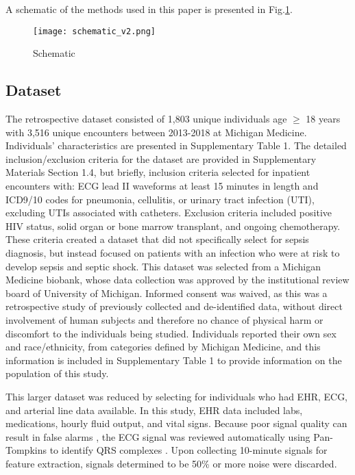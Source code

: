 
A schematic of the methods used in this paper is presented in Fig.\ref{fig:schematic}.

\begin{figure}[htb]
    \centering
    \texttt{[image: schematic\_v2.png]}
    \caption{Schematic}
    \label{fig:schematic}
\end{figure}

\subsection*{Dataset} \label{sec:methods_dataset}

The retrospective dataset consisted of 1,803 unique individuals age $\geq$ 18 years with 3,516 unique encounters between 2013-2018 at Michigan Medicine. Individuals' characteristics are presented in Supplementary Table 1. The detailed inclusion/exclusion criteria for the dataset are provided in Supplementary Materials Section 1.4, but briefly, inclusion criteria selected for inpatient encounters with: ECG lead II waveforms at least 15 minutes in length and ICD9/10 codes for pneumonia, cellulitis, or urinary tract infection (UTI), excluding UTIs associated with catheters. Exclusion criteria included positive HIV status, solid organ or bone marrow transplant, and ongoing chemotherapy. These criteria created a dataset that did not specifically select for sepsis diagnosis, but instead focused on patients with an infection who were at risk to develop sepsis and septic shock. This dataset was selected from a Michigan Medicine biobank, whose data collection was approved by the institutional review board of University of Michigan. Informed consent was waived, as this was a retrospective study of previously collected and de-identified data, without direct involvement of human subjects and therefore no chance of physical harm or discomfort to the individuals being studied. Individuals reported their own sex and race/ethnicity, from categories defined by Michigan Medicine, and this information is included in Supplementary Table 1 to provide information on the population of this study.

This larger dataset was reduced by selecting for individuals who had EHR, ECG, and arterial line data available. In this study, EHR data included labs, medications, hourly fluid output, and vital signs. Because poor signal quality can result in false alarms \autocite{gambarotta_review_2016}, the ECG signal was reviewed automatically using Pan-Tompkins to identify QRS complexes \autocite{pantom_1985, matlab-pantom}. Upon collecting 10-minute signals for feature extraction, signals determined to be 50\% or more noise were discarded.

